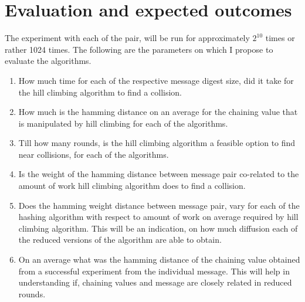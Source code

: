\chapter{Evaluation and expected outcomes}




The experiment with each of the pair, will be run for approximately $2^{10}$ times or rather 1024 times.
The following are the parameters on which I propose to evaluate the algorithms. 

\begin{enumerate}
  \item How much time for each of the respective message digest size, did it take for the hill climbing
    algorithm to find a collision.
  \item How much is the hamming distance on an average for the chaining value that is manipulated by
    hill climbing for each of the algorithms.
  \item Till how many rounds, is the hill climbing algorithm a feasible option to find near collisions,
    for each of the algorithms.
  \item Is the weight of the hamming distance between message pair co-related to the amount of work
    hill climbing algorithm does to find a collision.
  \item Does the hamming weight distance between message pair, vary for each of the hashing algorithm
    with respect to amount of work on average required by hill climbing algorithm. This will be an
    indication, on how much diffusion each of the reduced versions of the algorithm are able to obtain.
  \item On an average what was the hamming distance of the chaining value obtained from a successful
    experiment from the individual message. This will help in understanding if, chaining values and
    message are closely related in reduced rounds.
\end{enumerate}

